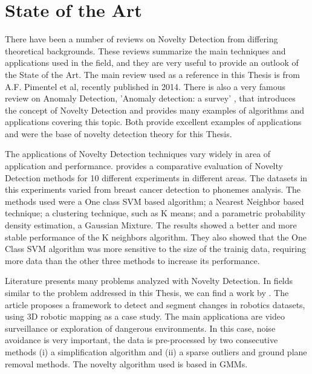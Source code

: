 
\chapter{State of the Art} %

\label{Chapter5} %



There have been a number of reviews on Novelty Detection from differing theoretical backgrounds. These reviews summarize the main techniques and applications used in the field, and they are very useful to provide an outlook of the State of the Art. The main review used as a reference in this Thesis is \cite{Pimentel2014} from A.F. Pimentel et al, recently published in 2014. There is also a very famous review on Anomaly Detection, 'Anomaly detection: a survey' \citet{Chandola2009}, that introduces the concept of Novelty Detection and provides many examples of algorithms and applications covering this topic. Both provide excellent examples of applications and were the base of novelty detection theory for this Thesis.

The applications of Novelty Detection techniques vary widely in area of application and performance. \citet{Ding2014} provides a comparative evaluation of Novelty Detection methods for 10 different experiments in different areas. The datasets in this experiments varied from breast cancer detection to phonemes analysis. The methods used were a One class SVM based algorithm; a Nearest Neighbor based technique; a clustering technique, such as K means; and a parametric probability density estimation, a Gaussian Mixture. The results showed a better and more stable performance of the K neighbors algorithm. They also showed that the One Class SVM algorithm was more sensitive to the size of the trainig data, requiring more data than the other three methods to increase its performance.  

Literature presents many problems analyzed with Novelty Detection. In fields similar to the problem addressed in this Thesis, we can find a work by \citet{GMM}. The article proposes a framework to detect and segment changes in robotics datasets, using 3D robotic mapping as a case study. The main applicationa are video surveillance or exploration of dangerous environments. In this case, noise avoidance is very important, the data is pre-processed by two consecutive methods (i) a simplification algorithm and (ii) a sparse outliers and ground plane removal methods. The novelty algorithm used is based in GMMs.

